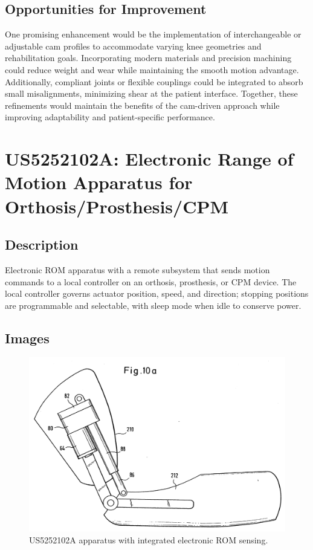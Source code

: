 \documentclass[11pt]{article}
\begin{document}
\subsection{Opportunities for Improvement}
One promising enhancement would be the implementation of interchangeable or adjustable cam profiles to accommodate varying knee geometries and rehabilitation goals. Incorporating modern materials and precision machining could reduce weight and wear while maintaining the smooth motion advantage. Additionally, compliant joints or flexible couplings could be integrated to absorb small misalignments, minimizing shear at the patient interface. Together, these refinements would maintain the benefits of the cam-driven approach while improving adaptability and patient-specific performance.

\section{US5252102A: Electronic Range of Motion Apparatus for Orthosis/Prosthesis/CPM}
\subsection{Description}
Electronic ROM apparatus with a remote subsystem that sends motion commands to a local controller on an orthosis, prosthesis, or CPM device. The local controller governs actuator position, speed, and direction; stopping positions are programmable and selectable, with sleep mode when idle to conserve power.
\subsection{Images}
\begin{figure}[H]
  \centering
  \includegraphics[width=0.54\linewidth]{US5252102_1.png}
  \caption{US5252102A apparatus with integrated electronic ROM sensing.}
  \label{fig:US5252102A}
\end{figure}
\end{document}
